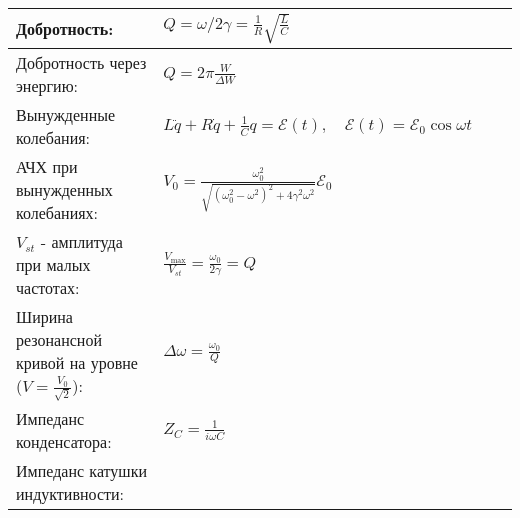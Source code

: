 \documentclass{article}
\begin{document}
\begin{tabular}{ |p{6cm}|p{3cm}|p{6cm}|p{3.5cm}|  }
\hline
Добротность:                                                               &
$Q=\omega / 2 \gamma = \frac{1}{R} \sqrt{\frac{L}{C}}$                     &
                                                                           &
                                                                           \\
\hline
Добротность через энергию:                                                 &
$Q=2 \pi \frac{W}{\Delta W}$                                               &
                                                                           &
                                                                           \\
\hline
Вынужденные колебания:                                                     &
$L \ddot{q}+R \dot{q}+\frac{1}{C} q=\mathcal{E}(t), \quad \mathcal{E}(t)=\mathcal{E}_{0} \cos \omega t$&
                                                                           &
                                                                           \\
\hline
АЧХ при вынужденных колебаниях:                                            &
$V_{0}=\frac{\omega_{0}^{2}}{\sqrt{\left(\omega_{0}^{2}-\omega^{2}\right)^{2}+4 \gamma^{2} \omega^{2}}} \mathcal{E}_{0}$&
                                                                           &
                                                                           \\
\hline
$V_{st}$ - амплитуда при малых частотах:                                   &
$\frac{V_{\max }}{V_{st}}=\frac{\omega_{0}}{2 \gamma}=Q$                   &
                                                                           &
                                                                           \\
\hline
Ширина резонансной кривой на уровне ($V = \frac{V_0}{\sqrt{2}}$):          &
$\Delta \omega=\frac{\omega_{0}}{Q}$                                       &
                                                                           &
                                                                           \\
\hline
Импеданс конденсатора:                                                     &
$Z_C = \frac{1}{i \omega C}$                                               &
                                                                           &
                                                                           \\
\hline
Импеданс катушки индуктивности:                                            &

\end{tabular}
\end{document}
